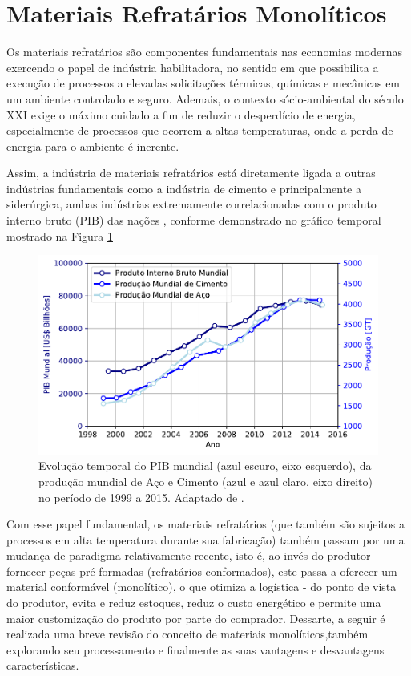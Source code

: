 
\section{Materiais Refratários Monolíticos}\label{mono}

	Os materiais refratários são componentes fundamentais nas economias modernas
  exercendo o papel de indústria habilitadora, no sentido em que possibilita a execução de processos a elevadas solicitações térmicas, químicas e mecânicas em um ambiente controlado e seguro. Ademais, o contexto sócio-ambiental do século XXI exige o máximo cuidado a fim de reduzir o desperdício de energia, especialmente de processos que ocorrem a altas temperaturas, onde a perda de energia para o ambiente é inerente.

	Assim, a indústria de materiais refratários está diretamente ligada a outras
  indústrias fundamentais como a indústria de cimento e principalmente a
  siderúrgica, ambas indústrias extremamente correlacionadas com o produto
  interno bruto (PIB) das nações\cite{Ravazzolo2017, Bordigoni2016, Dobrota2013} , conforme demonstrado no gráfico temporal mostrado na Figura \ref{fig:refractory_economy}

\begin{figure}[ht]
\centering
\includegraphics[width=\linewidth]{./figures/refractory_economy.pdf}
\caption{Evolução temporal do PIB mundial (azul escuro, eixo esquerdo), da produção mundial de Aço e Cimento (azul e azul claro, eixo direito) no período de 1999 a 2015.  Adaptado de \cite{GlobalRef2017}. \label{fig:refractory_economy}}
\end{figure}
		Com esse papel fundamental, os materiais refratários (que também são
    sujeitos a processos em alta temperatura durante sua fabricação) também passam por uma mudança de paradigma relativamente recente, isto é, ao invés do produtor fornecer peças pré-formadas (refratários conformados), este passa a oferecer um material conformável (monolítico), o que otimiza a logística - do ponto de vista do produtor, evita e reduz estoques, reduz o custo energético e permite uma maior customização do produto por parte do comprador.
    Dessarte, a seguir é realizada uma breve revisão do conceito de materiais monolíticos,também explorando seu processamento e finalmente as suas vantagens e desvantagens características.

